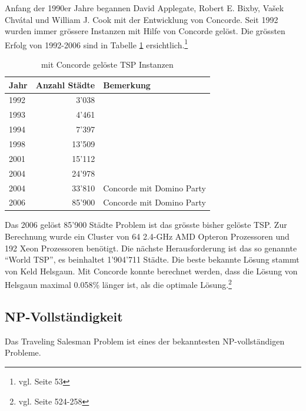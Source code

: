 \documentclass[11pt,a4paper]{article}
\begin{document}
Anfang der 1990er Jahre begannen David Applegate, Robert E. Bixby, Vašek Chvátal und William J. Cook mit der Entwicklung von Concorde. Seit 1992 wurden immer grössere Instanzen mit Hilfe von Concorde gelöst. Die grössten Erfolg von 1992-2006 sind in Tabelle \ref{tab:concorde_history} ersichtlich.\footnote{vgl. \cite{applegate06} Seite 53}

        \begin{table}[H]
                \centering
                \begin{tabular}{| l | r | l |}
                    \hline
                        Jahr    & Anzahl Städte & Bemerkung                 \\ \hline
                        1992    & 3'038         &                           \\ \hline
                        1993    & 4'461         &                           \\ \hline
                        1994    & 7'397         &                           \\ \hline
                        1998    & 13'509        &                           \\ \hline
                        2001    & 15'112        &                           \\ \hline
                        2004    & 24'978        &                           \\ \hline
                        2004    & 33'810        & Concorde mit Domino Party \\ \hline
                        2006    & 85'900        & Concorde mit Domino Party \\ \hline
                \end{tabular}
                \caption{mit Concorde gelöste TSP Instanzen}
                \label{tab:concorde_history}
        \end{table}

Das 2006 gelöst 85'900 Städte Problem ist das grösste bisher gelöste TSP. Zur Berechnung wurde ein Cluster von 64 2.4-GHz AMD Opteron Prozessoren und 192 Xeon Prozessoren benötigt.
Die nächste Herausforderung ist das so genannte "`World TSP"', es beinhaltet 1'904'711 Städte. Die beste bekannte Lösung stammt von Keld Helsgaun. Mit Concorde konnte berechnet werden, dass die Lösung von Helsgaun maximal 0.058\% länger ist, als die optimale Lösung.\footnote{vgl. \cite{applegate06} Seite 524-258}

\newpage

\subsection{NP-Vollständigkeit}
Das Traveling Salesman Problem ist eines der bekanntesten NP-vollständigen Probleme. 
\end{document}
